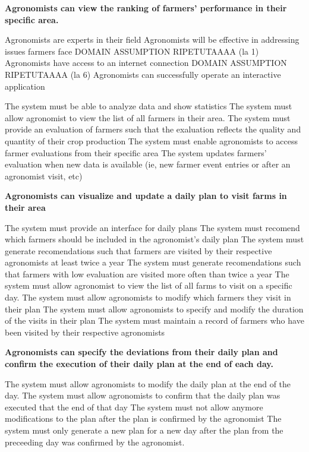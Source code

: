 \begin{itemize}
 \textbf{Agronomists can view the ranking of farmers’ performance in their specific area.}
\begin{itemize}
 Agronomists are experts in their field
 Agronomists will be effective in addressing issues farmers face
 DOMAIN ASSUMPTION RIPETUTAAAA (la 1)  Agronomists have access to an internet connection
 DOMAIN ASSUMPTION RIPETUTAAAA (la 6)  Agronomists can successfully operate an interactive application

  The system must be able to analyze data and show statistics
  The system must allow agronomist to view the list of all farmers in their area.
  The system must provide an evaluation of farmers such that the exaluation reflects the quality and quantity of their crop production
  The system must enable agronomists to access farmer evaluations from their specific area
  The system updates farmers' evaluation when new data is available (ie, new farmer event entries or after an agronomist visit, etc)
\end{itemize}

 \textbf{Agronomists can visualize and update a daily plan to visit farms in their area}
\begin{itemize}



  The system must provide an interface for daily plans
  The system must recomend which farmers should be included in the agronomist's daily plan
  The system must generate recomendations such that farmers are visited by their respective agronomists at least twice a year
  The system must generate recomendations such that farmers with low evaluation are visited more often than twice a year
  The system must allow agronomist to view the list of all farms to visit on a specific day.
  The system must allow agronomists to modify which farmers they visit in their plan
  The system must allow agronomists to specify and modify the duration of the visits in their plan
  The system must maintain a record of farmers who have been visited by their respective agronomists

\end{itemize}

 \textbf{Agronomists can specify the deviations from their daily plan and confirm the execution of their daily plan at the end of each day. }
\begin{itemize}
 The system must allow agronomists to modify the daily plan at the end of the day.
 The system must allow agronomists to confirm that the daily plan was executed that the end of that day
 The system must not allow anymore modifications to the plan after the plan is confirmed by the agronomist
 The system must only generate a new plan for a new day after the plan from the preceeding day was confirmed by the agronomist.
\end{itemize}


\end{itemize}
